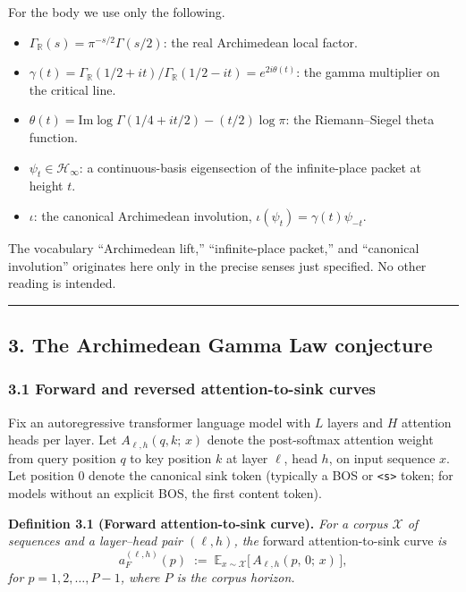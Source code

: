 \documentclass[
  letterpaper,
  11pt]{article}
\providecommand{\tightlist}{%
  \setlength{\itemsep}{0pt}\setlength{\parskip}{0pt}}
\theoremstyle{plain}
\theoremstyle{definition}
\theoremstyle{remark}
\begin{document}
For the body we use only the following.

\begin{itemize}
\tightlist
\item
  \(\Gamma_{\mathbb{R}}(s) = \pi^{-s/2}\Gamma(s/2)\): the real Archimedean local factor.
\item
  \(\gamma(t) = \Gamma_{\mathbb{R}}(1/2 + it)/\Gamma_{\mathbb{R}}(1/2 - it) = e^{2i\theta(t)}\): the gamma multiplier on the critical line.
\item
  \(\theta(t) = \mathrm{Im}\log\Gamma(1/4 + it/2) - (t/2)\log\pi\): the Riemann--Siegel theta function.
\item
  \(\psi_t \in \mathcal{H}_\infty\): a continuous-basis eigensection of the infinite-place packet at height \(t\).
\item
  \(\iota\): the canonical Archimedean involution, \(\iota(\psi_t) = \gamma(t)\psi_{-t}\).
\end{itemize}

The vocabulary ``Archimedean lift,'' ``infinite-place packet,'' and ``canonical involution'' originates here only in the precise senses just specified. No other reading is intended.

\begin{center}\rule{0.5\linewidth}{0.5pt}\end{center}

\subsection{3. The Archimedean Gamma Law conjecture}\label{the-archimedean-gamma-law-conjecture}

\subsubsection{3.1 Forward and reversed attention-to-sink curves}\label{forward-and-reversed-attention-to-sink-curves}

Fix an autoregressive transformer language model with \(L\) layers and \(H\) attention heads per layer. Let \(A_{\ell,h}(q, k;\, x)\) denote the post-softmax attention weight from query position \(q\) to key position \(k\) at layer \(\ell\), head \(h\), on input sequence \(x\). Let position \(0\) denote the canonical sink token (typically a BOS or \texttt{\textless{}s\textgreater{}} token; for models without an explicit BOS, the first content token).

\textbf{Definition 3.1 (Forward attention-to-sink curve).} \emph{For a corpus \(\mathcal{X}\) of sequences and a layer--head pair \((\ell, h)\), the} forward attention-to-sink curve \emph{is}
\[a_F^{(\ell, h)}(p) \;:=\; \mathbb{E}_{x \sim \mathcal{X}}\bigl[\, A_{\ell, h}(p,\, 0;\, x)\, \bigr],\]
\emph{for \(p = 1, 2, \ldots, P-1\), where \(P\) is the corpus horizon.}
\end{document}
